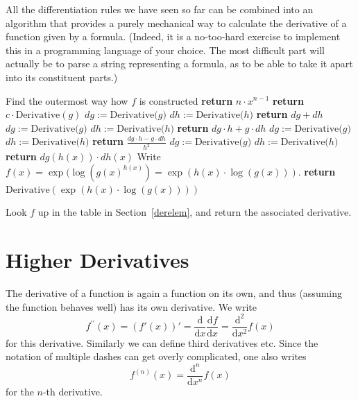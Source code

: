 All the differentiation rules we have seen so far can be combined into an
algorithm that provides a purely mechanical way to calculate the derivative
of a function given by a formula. (Indeed, it is a no-too-hard exercise to
implement this in a programming language of your choice. The most difficult
part will actually be to parse a string representing a formula, as to be able
to take it apart into its constituent parts.)

\begin{algorithmic}[5] 
\State Find the outermost way how $f$ is constructed
\State {}
\State \textbf{return} $n\cdot x^{n-1}$
\State \textbf{return} $c\cdot \mbox{Derivative}(g)$
\State
{}
\State $dg:=\mbox{Derivative($g$)}$
\State $dh:=\mbox{Derivative($h$)}$
\State \textbf{return} $dg+dh$ 
\State $dg:=\mbox{Derivative($g$)}$
\State $dh:=\mbox{Derivative($h$)}$
\State \textbf{return} $dg\cdot h+g\cdot dh$
\State $dg:=\mbox{Derivative($g$)}$
\State $dh:=\mbox{Derivative($h$)}$
\State \textbf{return} $\frac{dg\cdot h-g\cdot dh}{h^2}$
\State $dg:=\mbox{Derivative($g$)}$
\State $dh:=\mbox{Derivative($h$)}$
\State \textbf{return} $dg(h(x))\cdot dh(x)$
\State
Write $f(x)=\exp(\log(g(x)^{h(x)})=\exp(h(x)\cdot\log(g(x)))$.
\State \textbf{return} $\mbox{Derivative}(\exp(h(x)\cdot\log(g(x))))$

\Else
  \State Look $f$ up in the table in Section~\ref{derelem}, and return the associated derivative.
\EndIf
\EndProcedure
\end{algorithmic}

\section{Higher Derivatives}

The derivative of a function is again a function on its own, and thus
(assuming the function behaves well) has
its own derivative. We write
\[
f^{\prime\prime}(x)=(f'(x))'
=\frac{\mbox{d}}{\mbox{d}x}\frac{\mbox{d}f}{\mbox{d}x}
=\frac{\mbox{d}^2}{\mbox{d}x^2}f(x)
\]
for this derivative. Similarly we can define third derivatives etc. Since
the notation of multiple dashes can get overly complicated, one also writes
\[
f^{(n)}(x)=
\frac{\mbox{d}^n}{\mbox{d}x^n}f(x)
\]
for the $n$-th derivative.

